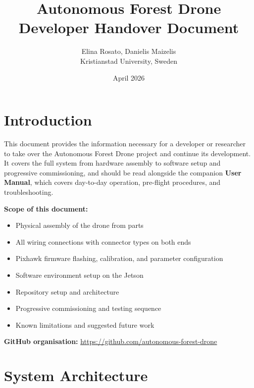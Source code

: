 \documentclass{article}
\begin{document}
\title{Autonomous Forest Drone\\[0.4em]\large Developer Handover Document}
\date{April 2026}
\author{Elina Rosato, Danielis Maizelis\\[0.3em]
\small Kristianstad University, Sweden}

\maketitle
\newpage

\tableofcontents
\newpage

\section{Introduction}

This document provides the information necessary for a developer or researcher to take over the Autonomous Forest Drone project and continue its development. It covers the full system from hardware assembly to software setup and progressive commissioning, and should be read alongside the companion \textbf{User Manual}, which covers day-to-day operation, pre-flight procedures, and troubleshooting.

\textbf{Scope of this document:}
\begin{itemize}
    \item Physical assembly of the drone from parts
    \item All wiring connections with connector types on both ends
    \item Pixhawk firmware flashing, calibration, and parameter configuration
    \item Software environment setup on the Jetson
    \item Repository setup and architecture
    \item Progressive commissioning and testing sequence
    \item Known limitations and suggested future work
\end{itemize}


\textbf{GitHub organisation:} \url{https://github.com/autonomous-forest-drone}

\section{System Architecture}
\end{document}

